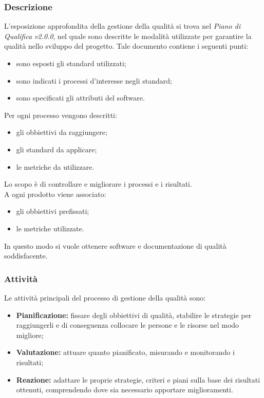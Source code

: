 \subsubsection{Descrizione}
L'esposizione approfondita della gestione della qualità si trova nel \textit{Piano di Qualifica v2.0.0}, nel quale sono descritte le modalità utilizzate per garantire la qualità nello sviluppo del progetto. Tale documento contiene i seguenti punti:
\begin{itemize}
    \item sono esposti gli standard utilizzati;
    \item sono indicati i processi d'interesse negli standard;
    \item sono specificati gli attributi del software.
\end{itemize}
Per ogni processo vengono descritti:
\begin{itemize}
    \item gli obbiettivi da raggiungere;
    \item gli standard da applicare;
    \item le metriche da utilizzare.
\end{itemize}
Lo scopo è di controllare e migliorare i processi e i risultati. \\
A ogni prodotto viene associato:
\begin{itemize}
    \item gli obbiettivi prefissati;
    \item le metriche utilizzate.
\end{itemize}
In questo modo si vuole ottenere software e documentazione di qualità soddisfacente.
\subsubsection{Attività}
Le attività principali del processo di gestione della qualità sono:
\begin{itemize}
    \item \textbf{Pianificazione:} fissare degli obbiettivi di qualità, stabilire le strategie per raggiungerli e di conseguenza collocare le persone e le risorse nel modo migliore;
    \item \textbf{Valutazione:} attuare quanto pianificato, misurando e monitorando i risultati;
    \item \textbf{Reazione:} adattare le proprie strategie, criteri e piani sulla base dei risultati ottenuti, comprendendo dove sia necessario apportare miglioramenti.
\end{itemize}
